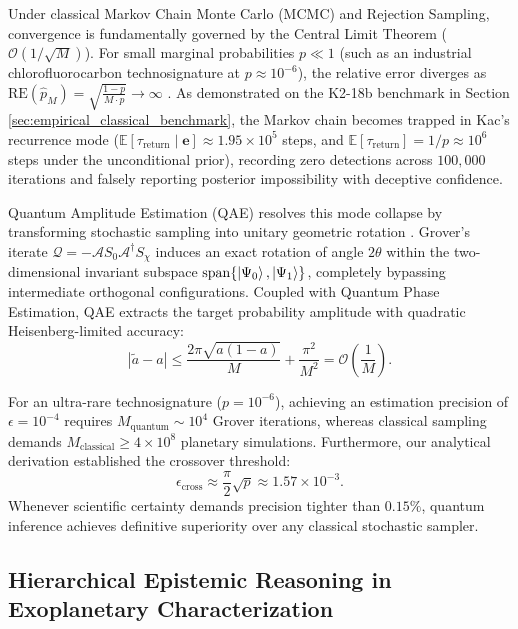 Under classical Markov Chain Monte Carlo (MCMC) and Rejection Sampling, convergence is fundamentally governed by the Central Limit Theorem ($\mathcal{O}(1/\sqrt{M})$). For small marginal probabilities $p \ll 1$ (such as an industrial chlorofluorocarbon technosignature at $p \approx 10^{-6}$), the relative error diverges as $\mathrm{RE}(\hat{p}_M) = \sqrt{\frac{1-p}{M \cdot p}} \to \infty$ \cite{lecuyer2010}. As demonstrated on the K2-18b benchmark in Section \ref{sec:empirical_classical_benchmark}, the Markov chain becomes trapped in Kac's recurrence mode ($\mathbb{E}[\tau_{\mathrm{return}} \mid \mathbf{e}] \approx 1.95 \times 10^5$ steps, and $\mathbb{E}[\tau_{\mathrm{return}}] = 1/p \approx 10^6$ steps under the unconditional prior), recording zero detections across $100,000$ iterations and falsely reporting posterior impossibility with deceptive confidence.

Quantum Amplitude Estimation (QAE) resolves this mode collapse by transforming stochastic sampling into unitary geometric rotation \cite{brassard2002}. Grover's iterate $\mathcal{Q} = -\mathcal{A} S_0 \mathcal{A}^\dagger S_\chi$ induces an exact rotation of angle $2\theta$ within the two-dimensional invariant subspace $\mathrm{span}\{\left|\Psi_0\right\rangle, \left|\Psi_1\right\rangle\}$, completely bypassing intermediate orthogonal configurations. Coupled with Quantum Phase Estimation, QAE extracts the target probability amplitude with quadratic Heisenberg-limited accuracy:
\begin{equation}
|\tilde{a} - a| \le \frac{2\pi \sqrt{a(1-a)}}{M} + \frac{\pi^2}{M^2} = \mathcal{O}\left(\frac{1}{M}\right).
\end{equation}

For an ultra-rare technosignature ($p = 10^{-6}$), achieving an estimation precision of $\epsilon = 10^{-4}$ requires $M_{\mathrm{quantum}} \sim 10^4$ Grover iterations, whereas classical sampling demands $M_{\mathrm{classical}} \ge 4 \times 10^8$ planetary simulations. Furthermore, our analytical derivation established the crossover threshold:
\begin{equation}
\epsilon_{\mathrm{cross}} \approx \frac{\pi}{2}\sqrt{p} \approx 1.57 \times 10^{-3}.
\end{equation}
Whenever scientific certainty demands precision tighter than $0.15\%$, quantum inference achieves definitive superiority over any classical stochastic sampler.

\subsection{Hierarchical Epistemic Reasoning in Exoplanetary Characterization}\label{subsec:conclusion_epistemic_hierarchy}

